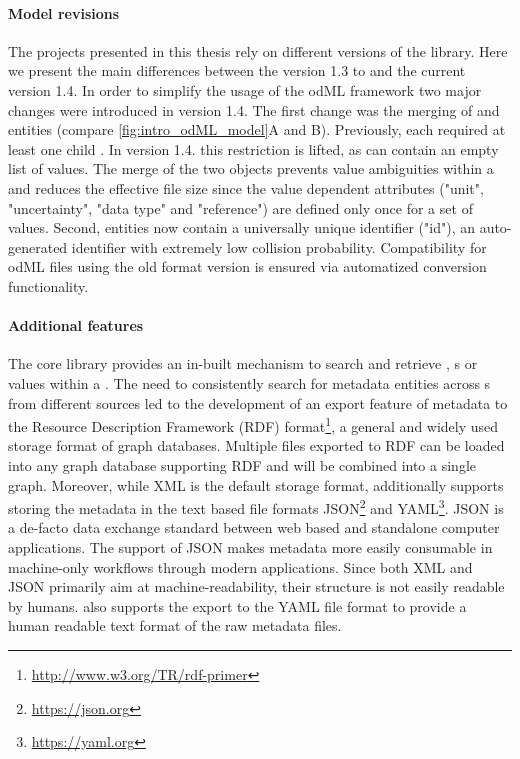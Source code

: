\paragraph{Model revisions}
\label{sec:odml_model_revision}
The projects presented in this thesis rely on different versions of the  library. Here we present the main differences between the  version 1.3 to and the current  version 1.4.
In order to simplify the usage of the odML framework two major changes were introduced in  version 1.4. The first change was the merging of  and  entities (compare \ref{fig:intro_odML_model}A and B). Previously, each  required at least one child . In version 1.4. this restriction is lifted, as  can contain an empty list of values. The merge of the two objects prevents value ambiguities within a  and reduces the effective file size since the value dependent attributes ("unit", "uncertainty", "data type" and "reference") are defined only once for a set of values. Second,  entities now contain a universally unique identifier ("id"), an auto-generated identifier with extremely low collision probability. Compatibility for odML files using the old format version is ensured via automatized conversion functionality.

\paragraph{Additional features}
The  core library provides an in-built mechanism to search and retrieve , s or values within a . The need to consistently search for metadata entities across s from different sources led to the development of an export feature of  metadata to the Resource Description Framework (RDF) format\footnote{\url{http://www.w3.org/TR/rdf-primer}}, a general and widely used storage format of graph databases. Multiple  files exported to RDF can be loaded into any graph database supporting RDF and will be combined into a single graph. Moreover, while XML is the default storage format,  additionally supports storing the metadata in the text based file formats JSON\footnote{\url{https://json.org}} and YAML\footnote{\url{https://yaml.org}}. JSON is a de-facto data exchange standard between web based and standalone computer applications. The support of JSON makes  metadata more easily consumable in machine-only workflows through modern applications. Since both XML and JSON primarily aim at machine-readability, their structure is not easily readable by humans.  also supports the export to the YAML file format to provide a human readable text format of the raw metadata files.

